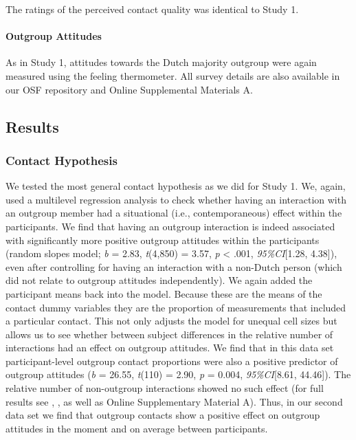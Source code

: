 The ratings of the perceived contact quality was identical to Study 1.

\paragraph{Outgroup Attitudes}

As in Study 1, attitudes towards the Dutch majority outgroup were again
measured using the feeling thermometer. All survey details are also
available in our OSF repository \citep{KreienkampMasked2022a} and Online
Supplemental Materials A.

\subsection{Results}

\subsubsection{Contact Hypothesis}

We tested the most general contact hypothesis as we did for Study 1. We,
again, used a multilevel regression analysis to check whether having an
interaction with an outgroup member had a situational (i.e.,
contemporaneous) effect within the participants. We find that having an
outgroup interaction is indeed associated with significantly more
positive outgroup attitudes within the participants (random slopes
model; \textit{b} = 2.83, \textit{t}(4,850) = 3.57, \textit{p}
\textless{} .001, \textit{95\%CI}{[}1.28, 4.38{]}), even after
controlling for having an interaction with a non-Dutch person (which did
not relate to outgroup attitudes independently). We again added the
participant means back into the model. Because these are the means of
the contact dummy variables they are the proportion of measurements that
included a particular contact. This not only adjusts the model for
unequal cell sizes but allows us to see whether between subject
differences in the relative number of interactions had an effect on
outgroup attitudes. We find that in this data set participant-level
outgroup contact proportions were also a positive predictor of outgroup
attitudes (\textit{b} = 26.55, \textit{t}(110) = 2.90, \textit{p} =
0.004, \textit{95\%CI}{[}8.61, 44.46{]}). The relative number of
non-outgroup interactions showed no such effect (for full results see
, ,
as well as Online Supplementary Material A). Thus, in our second data
set we find that outgroup contacts show a positive effect on outgroup
attitudes in the moment and on average between participants.

